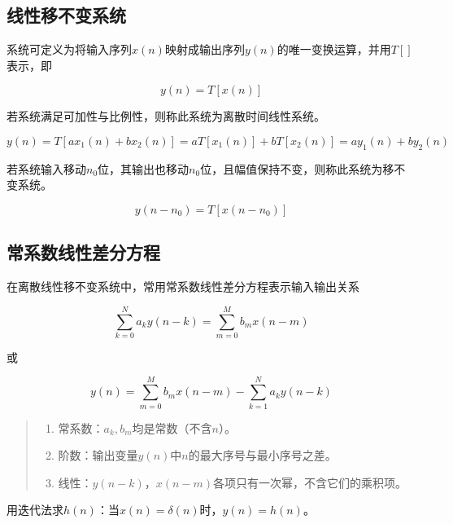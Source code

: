 \documentclass[cn, hazy, blue, normal, 14pt]{elegantnote}
\begin{document}
\subsection{线性移不变系统}

系统可定义为将输入序列$x(n)$映射成输出序列$y(n)$的唯一变换运算，并用$T[]$表示，即

\begin{equation}
        y(n)=T[x(n)]
\end{equation}

若系统满足可加性与比例性，则称此系统为离散时间线性系统。

\begin{equation}
        y(n)=T[ax_1(n)+bx_2(n)]=aT[x_1(n)]+bT[x_2(n)]=ay_1(n)+by_2(n)
\end{equation}

若系统输入移动$n_0$位，其输出也移动$n_0$位，且幅值保持不变，则称此系统为移不变系统。

\begin{equation}
        y(n-n_0)=T[x(n-n_0)]
\end{equation}

\subsection{常系数线性差分方程}

在离散线性移不变系统中，常用常系数线性差分方程表示输入输出关系

\begin{equation}
        \sum_{k=0}^{N}{a_k y(n-k)}=\sum_{m=0}^{M}{b_m x(n-m)}
\end{equation}

或

\begin{equation}
        y(n)=\sum_{m=0}^{M}{b_m x(n-m)}-\sum_{k=1}^{N}{a_k y(n-k)}
\end{equation}

\begin{quote}
\begin{enumerate}
    \item 常系数：$a_k, b_m$均是常数（不含$n$）。
    \item 阶数：输出变量$y(n)$中$n$的最大序号与最小序号之差。
    \item 线性：$y(n-k)$，$x(n-m)$各项只有一次幂，不含它们的乘积项。
\end{enumerate}
\end{quote}

用迭代法求$h(n)$：当$x(n)=\delta(n)$时，$y(n)=h(n)$。
\end{document}
